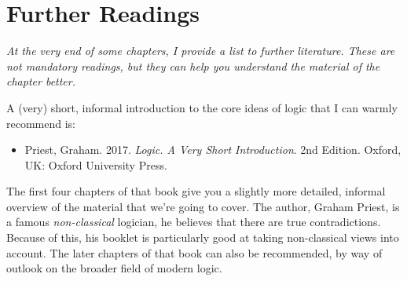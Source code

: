\section{Further Readings}

\emph{At the very end of some chapters, I provide a list to further literature. These are not mandatory readings, but they can help you understand the material of the chapter better.}

\vspace{2ex}

\noindent A (very) short, informal introduction to the core ideas of logic that I can warmly recommend is:

	\begin{itemize}
	
		\item Priest, Graham. 2017. \emph{Logic. A Very Short Introduction}. 2nd Edition. Oxford, UK: Oxford University Press. 
	
	\end{itemize}
	
\noindent The first four chapters of that book give you a slightly more detailed, informal overview of the material that we're going to cover. The author, Graham Priest, is a famous \emph{non-classical} logician, he believes that there are true contradictions. Because of this, his booklet is particularly good at taking non-classical views into account. The later chapters of that book can also be recommended, by way of outlook on the broader field of modern logic.

\vfill

\hfill {}

